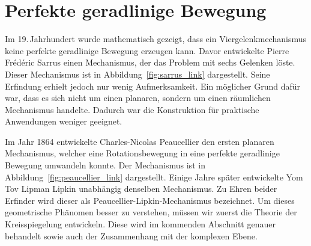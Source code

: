 %
%
%
%
\section{Perfekte geradlinige Bewegung
\label{geradlinig:section:perfekte_geradlinige}}
Im 19.\,Jahrhundert wurde mathematisch gezeigt, 
dass ein Viergelenkmechanismus keine perfekte geradlinige 
Bewegung erzeugen kann.
Davor entwickelte Pierre Frédéric Sarrus einen Mechanismus, 
%
der das Problem mit sechs Gelenken löste.
Dieser Mechanismus ist in Abbildung~\ref{fig:sarrus_link} dargestellt.
Seine Erfindung erhielt jedoch nur wenig Aufmerksamkeit.
Ein möglicher Grund dafür war, dass es sich nicht um einen planaren, 
sondern um einen räumlichen Mechanismus handelte.
Dadurch war die Konstruktion für praktische Anwendungen weniger geeignet.


Im Jahr 1864 entwickelte Charles-Nicolas Peaucellier den ersten 
%
planaren Mechanismus, welcher eine Rotationsbewegung in 
eine perfekte geradlinige Bewegung umwandeln konnte.
Der Mechanismus ist in Abbildung~\ref{fig:peaucellier_link} dargestellt.
Einige Jahre später entwickelte Yom Tov Lipman Lipkin 
%
unabhängig denselben Mechanismus.
Zu Ehren beider Erfinder wird dieser als 
Peaucellier-Lipkin-Mechanismus bezeichnet.
%
Um dieses geometrische Phänomen besser zu verstehen,
müssen wir zuerst die Theorie der Kreisspiegelung entwickeln.
%
Diese wird im kommenden Abschnitt genauer behandelt
sowie auch der Zusammenhang mit der komplexen Ebene.

